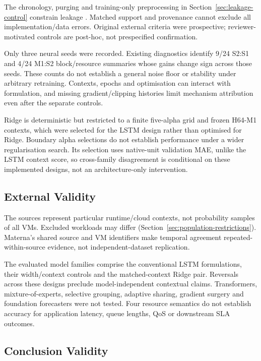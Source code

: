 \documentclass[a4paper,fleqn]{cas-dc}
\begin{document}
The chronology, purging and training-only preprocessing in
Section~\ref{sec:leakage-control} constrain leakage
\citep{Cerqueira2020Evaluation,Hyndman2021Forecasting}.
Matched support and provenance cannot exclude all implementation/data errors.
Original external criteria were prospective; reviewer-motivated controls are
post-hoc, not prespecified confirmation.

Only three neural seeds were recorded. Existing diagnostics identify 9/24
S2:S1 and 4/24 M1:S2 block/resource summaries whose gains change sign across
those seeds. These counts do not establish a general noise floor or stability
under arbitrary retraining. Contexts, epochs and optimisation can interact
with formulation, and missing gradient/clipping histories limit mechanism
attribution even after the separate controls.

Ridge is deterministic but restricted to a finite five-alpha grid and frozen
H64-M1 contexts, which were selected for the LSTM design rather than optimised
for Ridge. Boundary alpha selections do not establish performance under a
wider regularisation search. Its selection uses native-unit validation MAE,
unlike the LSTM context score, so cross-family disagreement is conditional on
these implemented designs, not an architecture-only intervention.

\subsection{External Validity}
\label{sec:threats-external}

The sources represent particular runtime/cloud contexts, not probability
samples of all VMs. Excluded workloads may differ
(Section~\ref{sec:population-restrictions}). Materna's shared source and VM
identifiers make temporal agreement repeated-within-source evidence, not
independent-dataset replication.

The evaluated model families comprise the conventional LSTM formulations,
their width/context controls and the matched-context Ridge pair. Reversals
across these designs preclude model-independent contextual claims.
Transformers, mixture-of-experts, selective grouping, adaptive sharing,
gradient surgery and foundation forecasters were not tested. Four resource
semantics do not establish accuracy for application latency, queue lengths,
QoS or downstream SLA outcomes.

\subsection{Conclusion Validity}
\label{sec:threats-conclusion}
\end{document}
